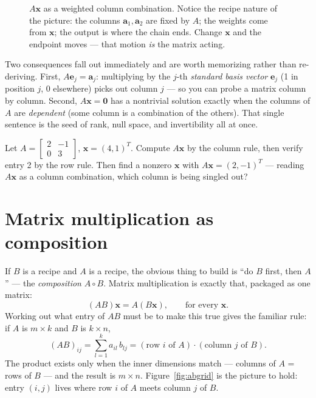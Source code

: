 \begin{figure}[htbp]
\centering

\caption{$A\mathbf{x}$ as a weighted column combination. Notice the recipe nature of the picture: the columns $\mathbf a_1,\mathbf a_2$ are fixed by $A$; the weights come from $\mathbf x$; the output is where the chain ends. Change $\mathbf x$ and the endpoint moves — that motion \emph{is} the matrix acting.}
\label{fig:axcol}
\end{figure}

Two consequences fall out immediately and are worth memorizing rather than re-deriving. First, $A\mathbf{e}_j=\mathbf{a}_j$: multiplying by the $j$-th \emph{standard basis vector} $\mathbf{e}_j$ (1 in position $j$, 0 elsewhere) picks out column $j$ — so you can probe a matrix column by column. Second, $A\mathbf{x}=\mathbf{0}$ has a nontrivial solution exactly when the columns of $A$ are \emph{dependent} (some column is a combination of the others). That single sentence is the seed of rank, null space, and invertibility all at once.

\begin{exercise}[easy]
Let $A=\begin{bmatrix} 2 & -1\\ 0 & 3\end{bmatrix}$, $\mathbf{x}=(4,1)^{T}$. Compute $A\mathbf{x}$ by the column rule, then verify entry 2 by the row rule. Then find a nonzero $\mathbf{x}$ with $A\mathbf{x}=(2,-1)^{T}$ — reading $A\mathbf{x}$ as a column combination, which column is being singled out?
\end{exercise}

\section{Matrix multiplication as composition}\label{sec:matmul}

If $B$ is a recipe and $A$ is a recipe, the obvious thing to build is ``do $B$ first, then $A$'' — the \emph{composition} $A\circ B$. Matrix multiplication is exactly that, packaged as one matrix:
\[
  (AB)\mathbf{x} = A(B\mathbf{x}), \qquad\text{for every }\mathbf{x}.
\]
Working out what entry of $AB$ must be to make this true gives the familiar rule: if $A$ is $m\times k$ and $B$ is $k\times n$,
\[
  (AB)_{ij} = \sum_{l=1}^{k} a_{il}\,b_{lj} = (\text{row $i$ of }A)\cdot(\text{column $j$ of }B).
\]
The product exists only when the inner dimensions match — columns of $A$ = rows of $B$ — and the result is $m\times n$. Figure~\ref{fig:abgrid} is the picture to hold: entry $(i,j)$ lives where row $i$ of $A$ meets column $j$ of $B$.


